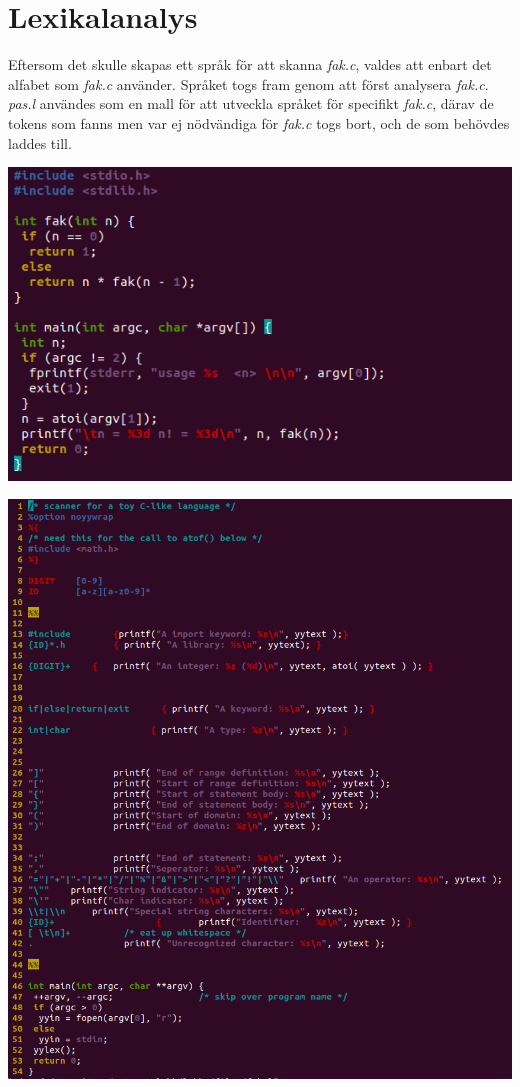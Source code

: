 \section{Lexikalanalys}

Eftersom det skulle skapas ett språk för att skanna \textit{fak.c}, valdes att enbart det alfabet
som \textit{fak.c} använder. Språket togs fram genom att först analysera \textit{fak.c}.
\\ \textit{pas.l} användes som en mall för att utveckla språket för specifikt \textit{fak.c},
därav de tokens som fanns men var ej nödvändiga för \textit{fak.c} togs bort, och de som
behövdes laddes till. 

\begin{center}
    \includegraphics[width=\linewidth]{bilder/fak_c.png}
    \label{fig:fak_c}
\end{center}

\begin{center}
    \includegraphics[width=\linewidth]{bilder/fak_l.png}
    \label{fig:fak_l}
\end{center}

